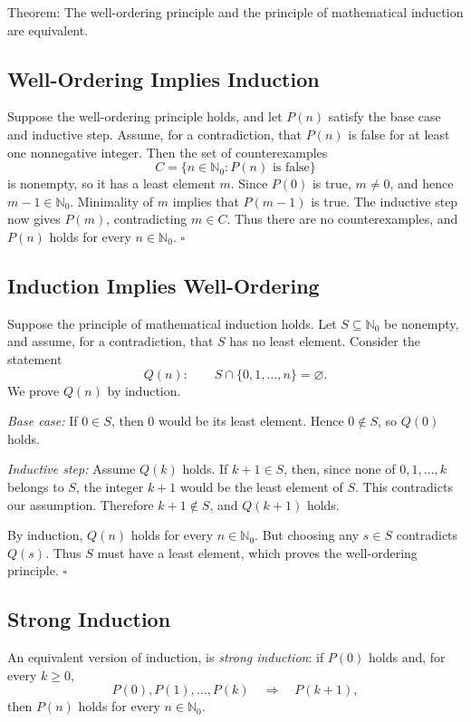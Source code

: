 \documentclass[a4paper,11pt,abstracton]{scrartcl}
\theoremstyle{dotlessP}
\theoremstyle{dotlessS}
\theoremstyle{remark}
\theoremstyle{definition}
\begin{document}
\begin{mainbox}{Theorem:}
The well-ordering principle and the principle of mathematical induction
are equivalent.
\end{mainbox}

\subsection{Well-Ordering Implies Induction}

Suppose the well-ordering principle holds, and let $P(n)$ satisfy the
base case and inductive step. Assume, for a contradiction, that $P(n)$
is false for at least one nonnegative integer. Then the set of
counterexamples
\[
    C=\{n\in\mathbb{N}_0 : P(n)\text{ is false}\}
\]
is nonempty, so it has a least element $m$. Since $P(0)$ is true,
$m\neq0$, and hence $m-1\in\mathbb{N}_0$. Minimality of $m$ implies
that $P(m-1)$ is true. The inductive step now gives $P(m)$, contradicting
$m\in C$. Thus there are no counterexamples, and $P(n)$ holds for every
$n\in\mathbb{N}_0$.
\hfill$\square$

\subsection{Induction Implies Well-Ordering}

Suppose the principle of mathematical induction holds. Let
$S\subseteq\mathbb{N}_0$ be nonempty, and assume, for a contradiction,
that $S$ has no least element. Consider the statement
\[
    Q(n):\qquad S\cap\{0,1,\ldots,n\}=\varnothing.
\]
We prove $Q(n)$ by induction.

\textit{Base case:}
If $0\in S$, then $0$ would be its least element. Hence $0\notin S$,
so $Q(0)$ holds.

\textit{Inductive step:}
Assume $Q(k)$ holds. If $k+1\in S$, then, since none of
$0,1,\ldots,k$ belongs to $S$, the integer $k+1$ would be the least
element of $S$. This contradicts our assumption. Therefore $k+1\notin S$,
and $Q(k+1)$ holds.

By induction, $Q(n)$ holds for every $n\in\mathbb{N}_0$. But choosing
any $s\in S$ contradicts $Q(s)$. Thus $S$ must have a least element,
which proves the well-ordering principle.
\hfill$\square$

\subsection{Strong Induction}

\begin{definition_box}
An equivalent version of induction, is
\emph{strong induction}: if $P(0)$ holds and, for every $k\geq0$,
\[
    P(0),P(1),\ldots,P(k)\quad\Longrightarrow\quad P(k+1),
\]
then $P(n)$ holds for every $n\in\mathbb{N}_0$.
\end{definition_box}
\end{document}
